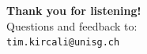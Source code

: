 \documentclass{beamer}
\begin{document}

\begin{frame}
\centering
\vfill

{\Huge \textbf{Thank you for listening!}} \\[1.5em]

{\Large Questions and feedback to:} \\[0.5em]
\texttt{tim.kircali@unisg.ch}

\vfill
\end{frame}

\appendix
\end{document}
